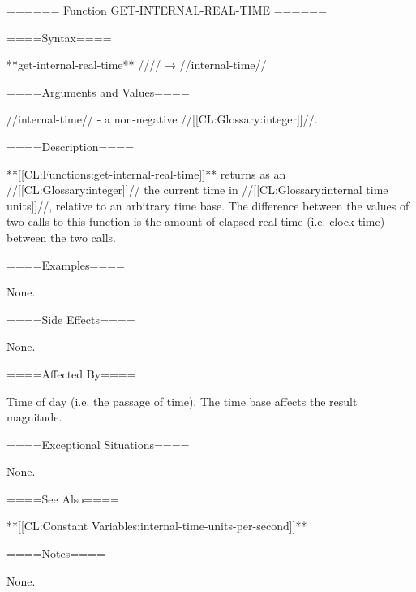 ====== Function GET-INTERNAL-REAL-TIME ======

====Syntax====

**get-internal-real-time** //\noargs// → //internal-time//

====Arguments and Values====

//internal-time// - a non-negative //[[CL:Glossary:integer]]//.

====Description====

**[[CL:Functions:get-internal-real-time]]** returns as an //[[CL:Glossary:integer]]// the current time in //[[CL:Glossary:internal time units]]//, relative to an arbitrary time base. The difference between the values of two calls to this function is the amount of elapsed real time (i.e. clock time) between the two calls.

====Examples====

None.

====Side Effects====

None.

====Affected By====

Time of day (i.e. the passage of time). The time base affects the result magnitude.

====Exceptional Situations====

None.

====See Also====

**[[CL:Constant Variables:internal-time-units-per-second]]**

====Notes====

None.



